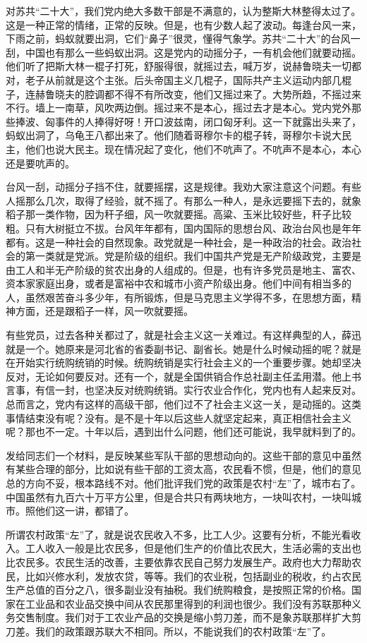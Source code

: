 对苏共“二十大”，我们党内绝大多数干部是不满意的，认为整斯大林整得太过了。这是一种正常的情绪，正常的反映。但是，也有少数人起了波动。每逢台风一来，下雨之前，蚂蚁就要出洞，它们“鼻子”很灵，懂得气象学。苏共“二十大”的台风一刮，中国也有那么一些蚂蚁出洞。这是党内的动摇分子，一有机会他们就要动摇。他们听了把斯大林一棍子打死，舒服得很，就摇过去，喊万岁，说赫鲁晓夫一切都对，老子从前就是这个主张。后头帝国主义几棍子，国际共产主义运动内部几棍子，连赫鲁晓夫的腔调都不得不有所改变，他们又摇过来了。大势所趋，不摇过来不行。墙上一南草，风吹两边倒。摇过来不是本心，摇过去才是本心。党内党外那些捧波、匈事件的人捧得好呀！开口波兹南，闭口匈牙利。这一下就露出头来了，蚂蚁出洞了，乌龟王八都出来了。他们随着哥穆尔卡的棍子转，哥穆尔卡说大民主，他们也说大民主。现在情况起了变化，他们不吭声了。不吭声不是本心，本心还是要吭声的。

台风一刮，动摇分子挡不住，就要摇摆，这是规律。我劝大家注意这个问题。有些人摇那么几次，取得了经验，就不摇了。有那么一种人，是永远要摇下去的，就象稻子那一类作物，因为秆子细，风一吹就要摇。高粱、玉米比较好些，秆子比较粗。只有大树挺立不拔。台风年年都有，国内国际的思想台风、政治台风也是年年都有。这是一种社会的自然现象。政党就是一种社会，是一种政治的社会。政治社会的第一类就是党派。党是阶级的组织。我们中国共产党是无产阶级政党，主要是由工人和半无产阶级的贫农出身的人组成的。但是，也有许多党员是地主、富农、资本家家庭出身，或者是富裕中农和城市小资产阶级出身。他们中间有相当多的人，虽然艰苦奋斗多少年，有所锻炼，但是马克思主义学得不多，在思想方面，精神方面，还是跟稻子一样，风一吹就要摇。

有些党员，过去各种关都过了，就是社会主义这一关难过。有这样典型的人，薛迅就是一个。她原来是河北省的省委副书记、副省长。她是什么时候动摇的呢？就是在开始实行统购统销的时候。统购统销是实行社会主义的一个重要步骤。她却坚决反对，无论如何要反对。还有一个，就是全国供销合作总社副主任孟用潜。他上书言事，有信一封，也坚决反对统购统销。实行农业合作化，党内也有人起来反对。总而言之，党内有这样的高级干部，他们过不了社会主义这一关，是动摇的。这类事情结束没有呢？没有。是不是十年以后这些人就坚定起来，真正相信社会主义呢？那也不一定。十年以后，遇到出什么问题，他们还可能说，我早就料到了的。

发给同志们一个材料，是反映某些军队干部的思想动向的。这些干部的意见中虽然有某些合理的部分，比如说有些干部的工资太高，农民看不惯，但是，他们的意见总的方向不妥，根本路线不对。他们批评我们党的政策是农村“左”了，城市右了。中国虽然有九百六十万平方公里，但是合共只有两块地方，一块叫农村，一块叫城市。照他们这一讲，都错了。

所谓农村政策“左”了，就是说农民收入不多，比工人少。这要有分析，不能光看收入。工人收入一般是比农民多，但是他们生产的价值比农民大，生活必需的支出也比农民多。农民生活的改善，主要依靠农民自己努力发展生产。政府也大力帮助农民，比如兴修水利，发放农贷，等等。我们的农业税，包括副业的税收，约占农民生产总值的百分之八，很多副业没有抽税。我们统购粮食，是按照正常的价格。国家在工业品和农业品交换中间从农民那里得到的利润也很少。我们没有苏联那种义务交售制度。我们对于工农业产品的交换是缩小剪刀差，而不是象苏联那样扩大剪刀差。我们的政策跟苏联大不相同。所以，不能说我们的农村政策“左”了。

